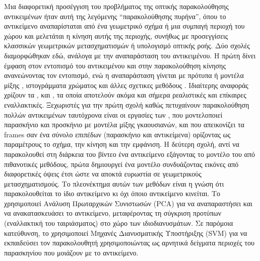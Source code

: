 \documentclass[11pt,a4paper,english,greek,twoside]{../Thesis}
\begin{document}
\par Μια διαφορετική προσέγγιση του προβλήματος της οπτικής παρακολούθησης αντικειμένων ήταν αυτή της λεγόμενης “παρακολούθησης πυρήνα”, όπου το αντικείμενο αναπαρίσταται από ένα γεωμετρικό σχήμα ή μια συμπαγή περιοχή του χώρου και μελετάται η κίνηση αυτής της περιοχής, συνήθως με προσεγγίσεις κλασσικών γεωμετρικών μετασχηματισμών ή υπολογισμό οπτικής ροής. Δύο σχολές διαμορφώθηκαν εδώ, ανάλογα με την αναπαράσταση του αντικειμένου. Η πρώτη δίνει έμφαση στον εντοπισμό του αντικειμένου και στην παρακολούθηση κίνησης ανανεώνοντας τον εντοπισμό, ενώ η αναπαράσταση γίνεται με πρότυπα \cite{birchfield_1998} ή μοντέλα μίξης \cite{jepson_2003}, ιστογράμματα χρώματος \cite{fieguth_1997} και άλλες σχετικες μεθόδους \cite{liu_2002}. Ιδιαίτερης αναφοράς χρίζουν τα \cite{lucas_1981}, \cite{shi_1994} και \cite{comaniciu_2002}, \cite{comaniciu_2003} τα οποία αποτελούν ακόμα και σήμερα ρεαλιστικές και επίκαιρες εναλλακτικές. Ξεχωριστές για την πρώτη σχολή καθώς πετυχαίνουν παρακολούθηση πολλών αντικειμένων ταυτόχρονα είναι οι εργασίες των \cite{isard_2001}, που μοντελοποιεί παρασκήνιο και προσκήνιο με μοντέλα μίξης γκαουσιανών, και \cite{tao_2002} που απεικονίζει τα frames σαν ένα σύνολο επιπέδων (παρασκήνιο και αντικείμενα) ορίζοντας ως παραμέτρους το σχήμα, την κίνηση και την εμφάνιση. Η δεύτερη σχολή, αντί να παρακολουθεί στη διάρκεια του βίντεο ένα αντικείμενο εξάγοντας το μοντέλο του από πιθανοτικές μεθόδους, πρώτα δημιουργεί ένα μοντέλο συνδυάζοντας εικόνες από διαφορετικές όψεις έτσι ώστε να αποκτά ευρωστία σε γεωμετρικούς μετασχηματισμούς. Το πλεονέκτημα αυτών των μεθόδων είναι η γνώση ότι παρακολουθείται το ίδιο αντικείμενο κι όχι όποιο αντικείμενο κινείται. Το \cite{black_1998} χρησιμοποιεί Ανάλυση Πρωταρχικών Συνιστωσών (PCA) για να αναπαραστήσει και να ανακατασκευάσει το αντικείμενο, μεταφέροντας τη σύγκριση προτύπων (εναλλακτική του ταιριάσματος) στο χώρο των ιδιοδιανυσμάτων. Σε παρόμοια κατεύθυνση, το \cite{avidan_2001} χρησιμοποιεί Μηχανές Διανυσματικής Υποστήριξης (SVM) για να εκπαιδεύσει τον παρακολουθητή χρησιμοποιώντας ως αρνητικά δείγματα περιοχές του παρασκηνίου που μοιάζουν με το αντικείμενο.
\end{document}
